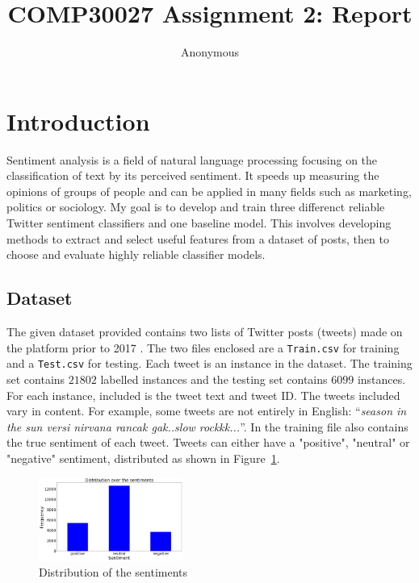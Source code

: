 \documentclass[11pt]{article}
\title{COMP30027 Assignment 2: Report}
\author
{Anonymous}
\begin{document}
\maketitle

\section{Introduction}\label{sec:intro}

Sentiment analysis is a field of natural language processing focusing on the classification of text by its perceived sentiment.
It speeds up measuring the opinions of groups of people and can be applied in many fields such as marketing, politics or sociology.
My goal is to develop and train three differenct reliable {T}witter sentiment classifiers and one baseline model.
This involves developing methods to extract and select useful features from a dataset of posts, 
then to choose and evaluate highly reliable classifier models.

\subsection{Dataset}\label{sec:dataset}

The given dataset provided contains two lists of {T}witter posts (tweets) made on the platform prior to 2017 \cite{dataset}.
The two files enclosed are a \texttt{Train.csv} for training and a \texttt{Test.csv} for testing. 
Each tweet is an instance in the dataset.
The training set contains $21802$ labelled instances and the testing set contains $6099$ instances. 
For each instance, included is the tweet text and tweet ID. 
The tweets included vary in content.
For example, some tweets are not entirely in English: ``\textit{season in the sun versi nirvana rancak gak..slow rockkk...}''.
In the training file also contains the true sentiment of each tweet. 
Tweets can either have a "positive", "neutral" or "negative" sentiment, distributed as shown in Figure~\ref{fig:sent-dist}.

\begin{figure}[!h]
	\centering
	\includegraphics[width = 0.42\textwidth]{sentiment-distribution.png}
	\caption{Distribution of the sentiments}
	\label{fig:sent-dist}
\end{figure} 
\end{document}

